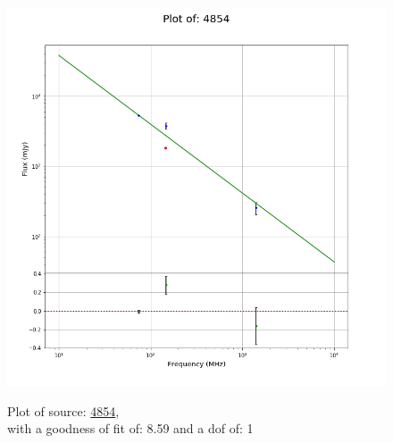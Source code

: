 \documentclass{article}
\begin{document}
\begin{figure}[H]
\begin{minipage}{0.5\textwidth}
        \includegraphics[scale = 0.35]{KmeulenSimSource_1hr/1hr4854.png}
        \captionsetup{labelformat=empty}
        \caption{Plot of source: \href{http://banana.transientskp.org/r4/vlo_KmeulenSimSource/runningcatalog/4854}{4854},\\with a goodness of fit of: 8.59 and a dof of: 1}
    \addtocounter{figure}{-1}
    \label{KmeulenSimSource:1hr:4854:plot}
    \end{minipage}
\end{figure}
\end{document}
